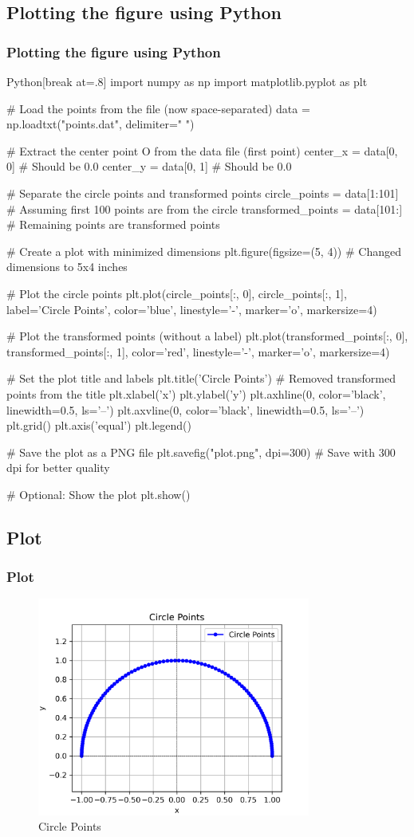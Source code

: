\documentclass{beamer}
\theoremstyle{remark}
\numberwithin{equation}{section}
\begin{document}
  \subsection{Plotting the figure using Python}
\begin{frame}
\frametitle{Plotting the figure using Python}
   \begin{mintedbox}{Python}[break at=.8\textheight]
import numpy as np
import matplotlib.pyplot as plt

# Load the points from the file (now space-separated)
data = np.loadtxt("points.dat", delimiter=" ")

# Extract the center point O from the data file (first point)
center_x = data[0, 0]  # Should be 0.0
center_y = data[0, 1]  # Should be 0.0

# Separate the circle points and transformed points
circle_points = data[1:101]  # Assuming first 100 points are from the circle
transformed_points = data[101:]  # Remaining points are transformed points

# Create a plot with minimized dimensions
plt.figure(figsize=(5, 4))  # Changed dimensions to 5x4 inches

# Plot the circle points
plt.plot(circle_points[:, 0], circle_points[:, 1], label='Circle Points', color='blue', linestyle='-', marker='o', markersize=4)

# Plot the transformed points (without a label)
plt.plot(transformed_points[:, 0], transformed_points[:, 1], color='red', linestyle='-', marker='o', markersize=4)

# Set the plot title and labels
plt.title('Circle Points')  # Removed transformed points from the title
plt.xlabel('x')
plt.ylabel('y')
plt.axhline(0, color='black', linewidth=0.5, ls='--')
plt.axvline(0, color='black', linewidth=0.5, ls='--')
plt.grid()
plt.axis('equal')
plt.legend()

# Save the plot as a PNG file
plt.savefig("plot.png", dpi=300)  # Save with 300 dpi for better quality

# Optional: Show the plot
plt.show()
  \end{mintedbox}
\end{frame}
\subsection{Plot}
\begin{frame}
	\frametitle{Plot}
\begin{figure}[h!]
    \centering
    \includegraphics[width=0.8\textwidth]{figs/plot.png} 
    \caption{Circle Points}
    \label{fig:circle_plot}
\end{figure}

\end{frame}
\end{document}
